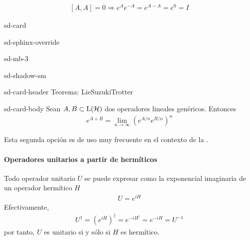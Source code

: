 \documentclass[letterpaper,10pt,english]{jupyterBook}
\newcommand{\Hil}{{\cal H}}
\begin{document}
\begin{equation*}
\begin{split}[A,A]=0 \Rightarrow e^A e^{-A} = e^{A-A} = e^0 = I\end{split}
\end{equation*}
\begin{sphinxuseclass}{sd-card}
\begin{sphinxuseclass}{sd-sphinx-override}
\begin{sphinxuseclass}{sd-mb-3}
\begin{sphinxuseclass}{sd-shadow-sm}
\begin{sphinxuseclass}{sd-card-header}
\sphinxAtStartPar
Teorema: Lie\sphinxhyphen{}Suzuki\sphinxhyphen{}Trotter

\end{sphinxuseclass}
\begin{sphinxuseclass}{sd-card-body}
\sphinxAtStartPar
Sean \(A,B\subset{\rm L}(\Hil)\) dos operadores lineales genéricos. Entonces
\begin{equation*}
\begin{split}
e^{A+B} = \lim_{n\to\infty} \left(e^{{A/n}} e^{B/n}\right)^n
\end{split}
\end{equation*}
\end{sphinxuseclass}
\end{sphinxuseclass}
\end{sphinxuseclass}
\end{sphinxuseclass}
\end{sphinxuseclass}
\sphinxAtStartPar
Esta segunda opción es de uso muy frecuente en el contexto de la .


\paragraph{Operadores unitarios a partir de hermíticos}
\label{\detokenize{docs/Part_01_Formalismo/Chapter_01_02_Formalismo_matem_xe1tico/01_03_Operadores_myst:operadores-unitarios-a-partir-de-hermiticos}}
\sphinxAtStartPar
Todo operador unitario \(U\) se puede expresar como la exponencial imaginaria de un operador hermítico \(H\)
\begin{equation*}
\begin{split}
U = e^{i H}
\end{split}
\end{equation*}
\sphinxAtStartPar
Efectivamente,
\begin{equation*}
\begin{split}U^\dagger = \left(e^{i H}\right)^\dagger = e^{-i H^\dagger} = e^{-i H}=U^{-1}\end{split}
\end{equation*}
\sphinxAtStartPar
por tanto, \(U\) es unitario si y sólo si \(H\) es hermítico.
\end{document}
